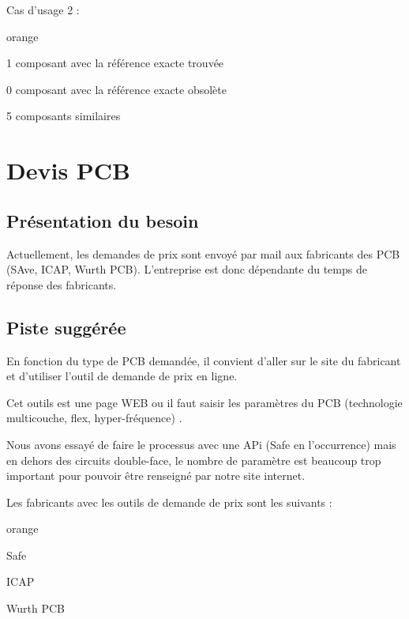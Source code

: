 Cas d'usage 2 : \\

\begin{items}{orange}{\Bullet}
\item 1 composant avec la référence exacte trouvée
\item 0 composant avec la référence exacte obsolète
\item 5 composants similaires
\end{items}



\chapter{Devis PCB}

\section{Présentation du besoin}

Actuellement, les demandes de prix sont envoyé par mail aux fabricants des PCB (SAve, ICAP, Wurth PCB). L'entreprise est donc dépendante du temps de réponse des fabricants.

\section{Piste suggérée}

En fonction du type de PCB demandée, il convient d'aller sur le site du fabricant et d’utiliser l'outil de demande de prix en ligne.

Cet outils est une page WEB ou il faut saisir les paramètres du PCB (technologie multicouche, flex, hyper-fréquence)
.

Nous avons essayé de faire le processus avec une APi (Safe en l’occurrence) mais en dehors des circuits double-face, le nombre de paramètre est beaucoup trop important pour pouvoir être renseigné par notre site internet.


Les fabricants avec les outils de demande de prix sont les suivants : 

\begin{items}{orange}{\Bullet}
\item Safe
\item ICAP
\item Wurth PCB
\end{items}




